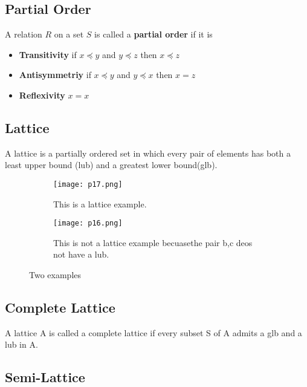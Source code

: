 \subsection{Partial Order}

A relation \(R\) on a set \(S\) is called a \textbf{partial order} if it is

\begin{itemize}
    \item \textbf{Transitivity} if \(x \preceq y\) and  \(y \preceq z\) then  \(x \preceq z\)
    \item \textbf{Antisymmetriy} if \(x \preceq y\) and  \(y \preceq x\) then  \(x = z\)
    \item \textbf{Reflexivity}  \(x = x\)
\end{itemize}    

\subsection{Lattice}

A lattice is a partially ordered set in which every pair of elements has both a least upper bound (lub)
 and a greatest lower bound(glb). 

\begin{figure}[h]
    \centering
    \begin{subfigure}[b]{0.3\textwidth}
        \centering
        \texttt{[image: p17.png]}
        \caption{This is a lattice example.}
        \label{fig:p17}
    \end{subfigure}
    \hfill
    \begin{subfigure}[b]{0.3\textwidth}
        \centering
        \texttt{[image: p16.png]}
        \caption{This is not a lattice example becuasethe pair {b,c} deos not have a lub.}
        \label{fig:three sin x}
    \end{subfigure}
       \caption{Two examples}
       \label{fig:p16}
\end{figure}





\subsection{Complete Lattice}

A lattice A is called a complete lattice if every subset S of A admits a
glb and a lub in A.



\subsection{Semi-Lattice}

